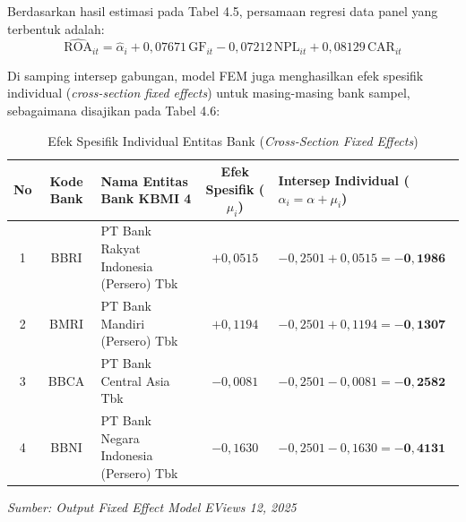 \documentclass[12pt,a4paper]{article}
\numberwithin{equation}{section}
\begin{document}
\noindent
Berdasarkan hasil estimasi pada Tabel 4.5, persamaan regresi data panel yang terbentuk adalah:
\begin{equation}
  \widehat{\text{ROA}}_{it} = \hat{\alpha}_i + 0{,}07671\,\text{GF}_{it} - 0{,}07212\,\text{NPL}_{it} + 0{,}08129\,\text{CAR}_{it}
\end{equation}

\noindent
Di samping intersep gabungan, model FEM juga menghasilkan efek spesifik individual (\emph{cross-section fixed effects}) untuk masing-masing bank sampel, sebagaimana disajikan pada Tabel 4.6:

\begin{table}[H]
  \caption{Efek Spesifik Individual Entitas Bank (\emph{Cross-Section Fixed Effects})}
  \label{tab:fixed_effects_bank}
  \begin{tabularx}{\textwidth}{|c|c|>{\raggedright\arraybackslash}X|c|>{\raggedright\arraybackslash}p{3.8cm}|}
    \hline
    \textbf{No} & \textbf{Kode Bank} & \textbf{Nama Entitas Bank KBMI 4} & \textbf{Efek Spesifik ($\mu_i$)} & \textbf{Intersep Individual ($\alpha_i = \alpha + \mu_i$)} \\
    \hline
    1 & BBRI & PT Bank Rakyat Indonesia (Persero) Tbk & $+0{,}0515$ & $-0{,}2501 + 0{,}0515 = \mathbf{-0{,}1986}$ \\
    \hline
    2 & BMRI & PT Bank Mandiri (Persero) Tbk & $+0{,}1194$ & $-0{,}2501 + 0{,}1194 = \mathbf{-0{,}1307}$ \\
    \hline
    3 & BBCA & PT Bank Central Asia Tbk & $-0{,}0081$ & $-0{,}2501 - 0{,}0081 = \mathbf{-0{,}2582}$ \\
    \hline
    4 & BBNI & PT Bank Negara Indonesia (Persero) Tbk & $-0{,}1630$ & $-0{,}2501 - 0{,}1630 = \mathbf{-0{,}4131}$ \\
    \hline
  \end{tabularx}
  \begin{flushleft}
    \textit{Sumber: Output Fixed Effect Model EViews 12, 2025}
  \end{flushleft}
\end{table}
\end{document}
